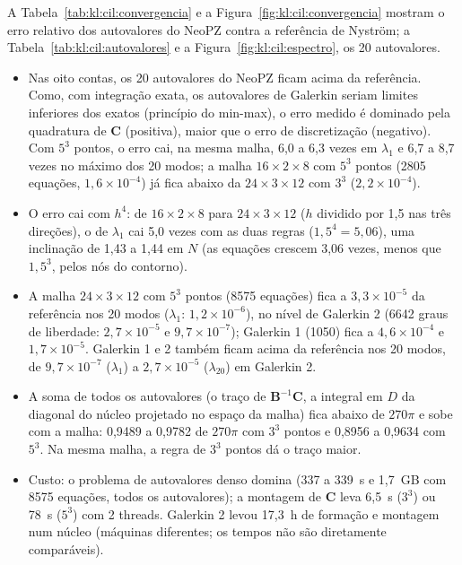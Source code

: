 A Tabela~\ref{tab:kl:cil:convergencia} e a Figura~\ref{fig:kl:cil:convergencia} mostram o erro relativo dos
autovalores do NeoPZ contra a referência de Nyström; a Tabela~\ref{tab:kl:cil:autovalores} e a
Figura~\ref{fig:kl:cil:espectro}, os 20 autovalores.
\begin{itemize}
  \item Nas oito contas, os 20 autovalores do NeoPZ ficam acima da referência. Como, com integração exata, os
    autovalores de Galerkin seriam limites inferiores dos exatos (princípio do min-max), o erro medido é dominado
    pela quadratura de $\mathbf{C}$ (positiva), maior que o erro de discretização (negativo). Com $5^3$ pontos, o erro cai, na mesma malha, 6,0 a 6,3 vezes em $\lambda_1$ e 6,7 a
    8,7 vezes no máximo dos 20 modos; a malha $16 \times 2 \times 8$ com $5^3$ pontos (2805 equações,
    $1{,}6 \times 10^{-4}$) já fica abaixo da $24 \times 3 \times 12$ com $3^3$ ($2{,}2 \times 10^{-4}$).
  \item O erro cai com $h^4$: de $16 \times 2 \times 8$ para $24 \times 3 \times 12$ ($h$ dividido por 1,5 nas três
    direções), o de $\lambda_1$ cai 5,0 vezes com as duas regras ($1{,}5^4 = 5{,}06$), uma inclinação de 1,43 a 1,44
    em $N$ (as equações crescem 3,06 vezes, menos que $1{,}5^3$, pelos nós do contorno).
  \item A malha $24 \times 3 \times 12$ com $5^3$ pontos (8575 equações) fica a $3{,}3 \times 10^{-5}$ da referência
    nos 20 modos ($\lambda_1$: $1{,}2 \times 10^{-6}$), no nível de Galerkin 2 (6642 graus de liberdade:
    $2{,}7 \times 10^{-5}$ e $9{,}7 \times 10^{-7}$); Galerkin 1 (1050) fica a $4{,}6 \times 10^{-4}$ e
    $1{,}7 \times 10^{-5}$. Galerkin 1 e 2 também ficam acima da referência nos 20 modos, de
    $9{,}7 \times 10^{-7}$ ($\lambda_1$) a $2{,}7 \times 10^{-5}$ ($\lambda_{20}$) em Galerkin 2.
  \item A soma de todos os autovalores (o traço de $\mathbf{B}^{-1}\mathbf{C}$, a integral em $D$ da diagonal do
    núcleo projetado no espaço da malha) fica abaixo de $270\pi$ e sobe com a malha: 0,9489 a 0,9782 de $270\pi$ com
    $3^3$ pontos e 0,8956 a 0,9634 com $5^3$. Na mesma malha, a regra de $3^3$ pontos dá o traço maior.
  \item Custo: o problema de autovalores denso domina (337 a 339~s e 1,7~GB com 8575 equações, todos os autovalores);
    a montagem de $\mathbf{C}$ leva 6,5~s ($3^3$) ou 78~s ($5^3$) com 2 threads. Galerkin 2 levou 17,3~h de formação
    e montagem num núcleo (máquinas diferentes; os tempos não são diretamente comparáveis).
\end{itemize}


